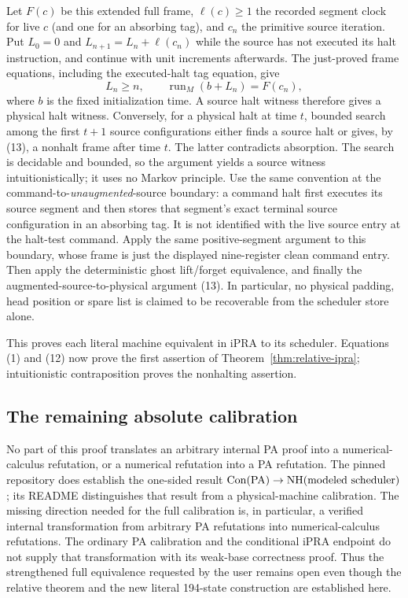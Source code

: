 Let $F(c)$ be this extended full frame, $\ell(c)\geq1$ the
recorded segment clock for live $c$ (and one for an absorbing tag),
and $c_n$ the primitive source iteration.
Put $L_0=0$ and $L_{n+1}=L_n+\ell(c_n)$ while the source has
not executed its halt instruction, and continue with unit increments
afterwards.  The just-proved frame equations, including the
executed-halt tag equation, give
\[
 L_n\geq n,\qquad
 \operatorname{run}_M(b+L_n)=F(c_n),                       \tag{13}
\]
where $b$ is the fixed initialization time.  A source halt witness
therefore gives a physical halt witness.
Conversely, for a physical halt at time
$t$, bounded search among the first $t+1$ source configurations
either finds a source halt or gives, by (13), a nonhalt frame after
time $t$.  The latter contradicts absorption.  The search is
decidable and bounded, so the argument yields a source witness
intuitionistically; it uses no Markov principle.  Use the same
convention at the command-to-\emph{unaugmented}-source boundary:
a command halt first
executes its source segment and then stores that segment's exact
terminal source configuration in an absorbing tag.  It is not
identified with the live source entry at the halt-test command.
Apply the same positive-segment argument to this boundary, whose
frame is just the displayed nine-register clean command entry.
Then apply the deterministic ghost lift/forget equivalence, and
finally the augmented-source-to-physical argument (13).  In
particular, no physical padding, head position or spare list is
claimed to be recoverable from the scheduler store alone.

This proves each literal machine equivalent in iPRA to its
scheduler.  Equations (1) and (12) now prove the first assertion of
Theorem~\ref{thm:relative-ipra}; intuitionistic contraposition proves
the nonhalting assertion.

\subsection{The remaining absolute calibration}

No part of this proof translates an arbitrary internal PA proof
into a numerical-calculus refutation, or a numerical refutation
into a PA refutation.  The pinned repository does establish the
one-sided result $\operatorname{Con}(\mathrm{PA})\to\operatorname{NH}(\text{modeled scheduler})$;
its README distinguishes that result from a physical-machine
calibration.  The missing direction needed for the full calibration
is, in particular, a verified internal transformation from arbitrary
PA refutations into numerical-calculus refutations.  The ordinary
PA calibration and the conditional iPRA endpoint do not supply
that transformation with its weak-base correctness proof.  Thus
the strengthened full equivalence requested by the user remains
open even though the relative theorem and the new literal
194-state construction are established here.
